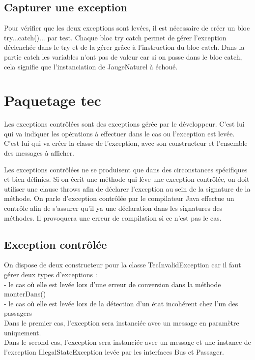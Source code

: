 \documentclass[12pt,a4paper]{article}
\begin{document}
\subsection{Capturer une exception}

Pour vérifier que les deux exceptions sont levées, il est nécessaire de créer un bloc try{...}catch(){...} par test.
Chaque bloc try catch permet de gérer l'exception déclenchée dans le try et de la gérer grâce à l'instruction du bloc catch.
Dans la partie catch les variables n'ont pas de valeur car si on passe dans le bloc catch, cela signifie que l'instanciation de JaugeNaturel à échoué.  

\newpage
\section{Paquetage tec}

Les exceptions contrôlées sont des exceptions gérée par le développeur. C'est lui qui va indiquer les opérations à effectuer dans le cas ou l'exception est levée. C'est lui qui va créer la classe de l'exception, avec son constructeur et l'ensemble des messages à afficher.

Les exceptions contrôlées ne se produisent que dans des circonstances spécifiques et bien définies.
Si on écrit une méthode qui lève une exception contrôlée, on doit utiliser une clause throws afin de déclarer l'exception au sein de la signature de la méthode.
On parle d'exception contrôlée par le compilateur Java effectue un contrôle afin de s'assurer qu'il ya une déclaration dans les signatures des méthodes. Il provoquera une erreur de compilation si ce n'est pas le cas.

\subsection{Exception contrôlée} 

On dispose de deux constructeur pour la classe TecInvalidException car il faut gérer deux types d'exceptions :\\
- le cas où elle est levée lors d'une erreur de conversion dans la méthode monterDans()\\
- le cas où elle est levée lors de la détection d'un état incohérent chez l'un des passagers\\

Dans le premier cas, l'exception sera instanciée avec un message en paramètre uniquement.\\
Dans le second cas, l'exception sera instanciée avec un message et une instance de l'exception  IllegalStateException levée par les interfaces Bus et Passager. \\
\end{document}
